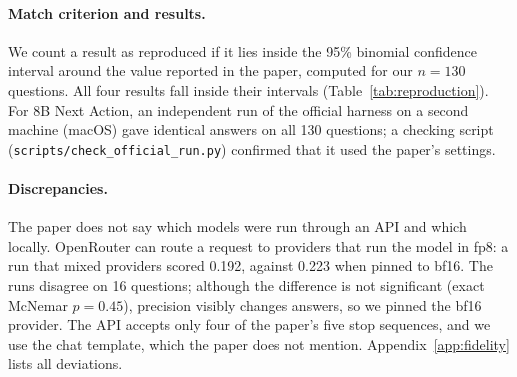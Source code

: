 \paragraph{Match criterion and results.}
We count a result as reproduced if it lies inside the 95\% binomial confidence interval around the
value reported in the paper, computed for our $n=130$ questions. All four results fall inside
their intervals (Table~\ref{tab:reproduction}). For 8B Next Action, an independent run of the official harness on a second machine (macOS) gave identical answers on all 130 questions; a checking script
(\texttt{scripts/check\_official\_run.py}) confirmed that it used the paper's settings.



\paragraph{Discrepancies.}
The paper does not say which models were run through an API and which locally. OpenRouter can
route a request to providers that run the model in fp8: a run that mixed providers scored 0.192,
against 0.223 when pinned to bf16. The runs disagree on 16 questions; although the difference is
not significant (exact McNemar $p=0.45$), precision visibly changes answers, so we pinned the bf16
provider. The API accepts only four of the paper's five stop sequences, and we use the chat
template, which the paper does not mention. Appendix~\ref{app:fidelity} lists all deviations.

